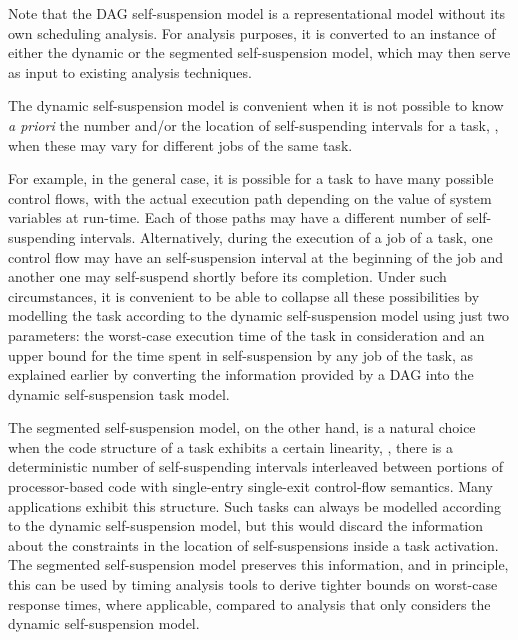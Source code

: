 Note that the DAG self-suspension model is a representational model without its own scheduling analysis. For analysis purposes, it is converted to an instance of either the dynamic or the segmented self-suspension model, which may then serve as input to existing analysis techniques. 

The dynamic self-suspension model is convenient when it is not possible to know \textit{a priori} the number and/or the location of self-suspending intervals for a task, \eg, when these may vary for different jobs of the same task.

For example, in the general case, it is possible for a task to have many possible control flows, with the actual execution path depending on the value
of system variables at run-time. Each of those paths may have a different
number of self-suspending intervals. Alternatively, during the execution of a job of a task, one control flow may have an self-suspension interval at the beginning of the job and
another one may self-suspend shortly before its completion. Under such circumstances, it is convenient to be able to collapse all these possibilities
by modelling the task according to the dynamic self-suspension model using
just two parameters: the worst-case execution time of the task in consideration and an upper bound for the time spent in self-suspension by any job of the task, as explained earlier by converting the information provided by a DAG into the dynamic self-suspension task model. 
  
The segmented self-suspension model, on the other hand, is a natural choice when the code structure of a task exhibits a certain linearity,
\ie, there is a deterministic number of self-suspending intervals interleaved between portions of processor-based code with single-entry
single-exit control-flow semantics. Many applications exhibit this structure. Such tasks can always be modelled according to the dynamic self-suspension
model, but this would discard the information about the constraints in the location of self-suspensions inside a task 
activation. The segmented self-suspension model preserves this information, and in principle, this can be used by timing analysis tools 
to derive tighter bounds on worst-case response times, where applicable, compared to analysis that only considers the dynamic self-suspension model. 

